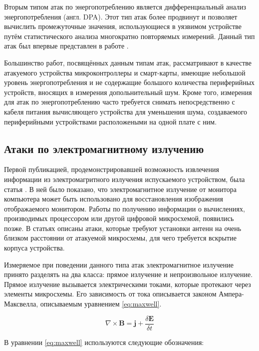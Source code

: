 Вторым типом атак по энергопотреблению является дифференциальный анализ
энергопотребления (англ. DPA). Этот тип атак более продвинут и позволяет
вычислить промежуточные значения, использующиеся в уязвимом устройстве путём
статистического анализа многократно повторяемых измерений. Данный тип атак был
впервые представлен в работе \cite{kocher-dpa}.

Большинство работ, посвящённых данным типам атак, рассматривают в качестве
атакуемого устройства микроконтроллеры и смарт-карты, имеющие небольшой уровень
энергопотребления и не содержащие большого количества периферийных устройств,
вносящих в измерения допольнительный шум. Кроме того, измерения для атак по
энергопотреблению часто требуется снимать непосредственно с кабеля питания
вычисляющего устройства для уменьшения шума, создаваемого периферийными
устройствами расположеными на одной плате с ним.

\subsection{Атаки по электромагнитному излучению}

Первой публикацией, продемонстрировавшей возможность извлечения информации
из электромагритного излучения испускаемого устройством, была статья
\cite{van-eck}. В ней было показано, что электромагнитное излучение от монитора
компьютера может быть использовано для восстановления изображения отображаемого
монитором. Работы по получению информации о вычислениях, производимых
процессором или другой цифровой микросхемой, появились позже. В статьях
\cite{ema1} \cite{ema2} описаны атаки, которые требуют установки антенн на очень
близком расстоянии от атакуемой микросхемы, для чего требуется вскрытие корпуса
устройства.

Измеряемое при поведении данного типа атак электромагнитное излучение принято
разделять на два класса: прямое излучение и непроизвольное излучение. Прямое
излучение вызывается электрическими токами, которые протекают через элементы
микросхемы. Его зависимость от тока описывается законом Ампера-Максвелла,
описываемым уравнением \ref{eq:maxwell}.

\nopagebreak

\begin{equation} \label{eq:maxwell}
\nabla \times \mathbf{B} = \mathbf{j} + \frac{\delta \mathbf{E}}{\delta t}
\end{equation}

В уравнении \ref{eq:maxwell} используются следующие обозначения:


